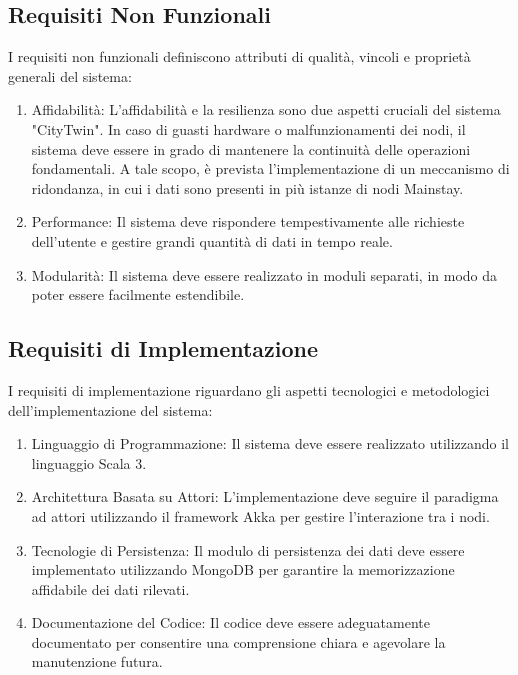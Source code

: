 \documentclass[12pt]{article}
\begin{document}
\subsection{Requisiti Non Funzionali}
I requisiti non funzionali definiscono attributi di qualità, vincoli e proprietà generali del sistema:
\begin{enumerate}
    \item Affidabilità: L'affidabilità e la resilienza sono due aspetti cruciali del sistema "CityTwin". In caso di guasti hardware o malfunzionamenti dei nodi, il sistema deve essere in grado di mantenere la continuità delle operazioni fondamentali. A tale scopo, è prevista l'implementazione di un meccanismo di ridondanza, in cui i dati sono presenti in più istanze di nodi Mainstay.
    \item Performance: Il sistema deve rispondere tempestivamente alle richieste dell'utente e gestire grandi quantità di dati in tempo reale.
    \item Modularità: Il sistema deve essere realizzato in moduli separati, in modo da poter essere facilmente estendibile.
\end{enumerate}

\subsection{Requisiti di Implementazione}
I requisiti di implementazione riguardano gli aspetti tecnologici e metodologici dell'implementazione del sistema:
\begin{enumerate}
    \item Linguaggio di Programmazione: Il sistema deve essere realizzato utilizzando il linguaggio Scala 3.
    \item Architettura Basata su Attori: L'implementazione deve seguire il paradigma ad attori utilizzando il framework Akka per gestire l'interazione tra i nodi.
    \item Tecnologie di Persistenza: Il modulo di persistenza dei dati deve essere implementato utilizzando MongoDB per garantire la memorizzazione affidabile dei dati rilevati.
    \item Documentazione del Codice: Il codice deve essere adeguatamente documentato per consentire una comprensione chiara e agevolare la manutenzione futura.
\end{enumerate}


\newpage


\end{document}
